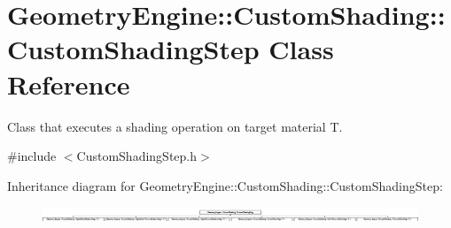 \hypertarget{class_geometry_engine_1_1_custom_shading_1_1_custom_shading_step}{}\section{Geometry\+Engine\+::Custom\+Shading\+::Custom\+Shading\+Step Class Reference}
\label{class_geometry_engine_1_1_custom_shading_1_1_custom_shading_step}


Class that executes a shading operation on target material T.  




{\ttfamily \#include $<$Custom\+Shading\+Step.\+h$>$}

Inheritance diagram for Geometry\+Engine\+::Custom\+Shading\+::Custom\+Shading\+Step\+:\begin{figure}[H]
\begin{center}
\leavevmode
\includegraphics[height=0.449799cm]{class_geometry_engine_1_1_custom_shading_1_1_custom_shading_step}
\end{center}
\end{figure}
